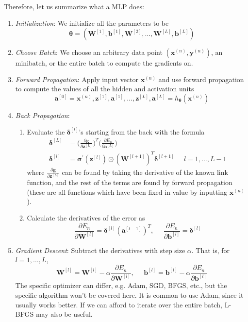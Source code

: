 \documentclass{article}
\begin{document}
    Therefore, let us summarize what a MLP does: 
    \begin{enumerate}
      \item \textit{Initialization}: We initialize all the parameters to be 
      \[\boldsymbol{\theta} = (\mathbf{W}^{[1]}, \mathbf{b}^{[1]}, \mathbf{W}^{[2]}, \ldots, \mathbf{W}^{[L]}, \mathbf{b}^{[L]})\]
      
      \item \textit{Choose Batch}: We choose an arbitrary data point $(\mathbf{x}^{(n)}, \mathbf{y}^{(n)})$, an minibatch, or the entire batch to compute the gradients on. 
      
      \item \textit{Forward Propagation}: Apply input vector $\mathbf{x}^{(n)}$ and use forward propagation to compute the values of all the hidden and activation units 
      \[\mathbf{a}^{[0]} = \mathbf{x}^{(n)}, \mathbf{z}^{[1]}, \mathbf{a}^{[1]}, \ldots, \mathbf{z}^{[L]}, \mathbf{a}^{[L]} = h_{\boldsymbol{\theta}} (\mathbf{x}^{(n)})\]
      
      \item \textit{Back Propagation}: 
      \begin{enumerate}
          \item Evaluate the $\boldsymbol{\delta}^{[l]}$'s starting from the back with the formula 
          \begin{align*}
              \boldsymbol{\delta}^{[L]} & = \bigg( \frac{\partial \mathbf{g}}{\partial \mathbf{z}^{[L]}} \bigg)^T \bigg( \frac{\partial E_n}{\partial \mathbf{a}^{[L]}} \bigg) \\
              \boldsymbol{\delta}^{[l]} & = \boldsymbol{\sigma}^\prime (\mathbf{z}^{[l]}) \odot (\mathbf{W}^{[l+1]})^T \boldsymbol{\delta}^{[l+1]} \;\;\;\;\; l = 1, \ldots, L-1
          \end{align*}
          where $\frac{\partial \mathbf{g}}{\partial \mathbf{z}^{[L]}}$ can be found by taking the derivative of the known link function, and the rest of the terms are found by forward propagation (these are all functions which have been fixed in value by inputting $\mathbf{x}^{(n)}$).  

          \item Calculate the derivatives of the error as 
          \[\frac{\partial E_n}{\partial \mathbf{W}^{[l]}} = \boldsymbol{\delta}^{[l]} (\mathbf{a}^{[l-1]})^T, \;\;\;\;\; \frac{\partial E_n}{\partial \mathbf{b}^{[l]}} = \boldsymbol{\delta}^{[l]}\]
      \end{enumerate}
      
      \item \textit{Gradient Descent}: Subtract the derivatives with step size $\alpha$. That is, for $l = 1, \ldots, L$, 
      \[\mathbf{W}^{[l]} = \mathbf{W}^{[l]} - \alpha \frac{\partial E_n}{\partial \mathbf{W}^{[l]}} , \;\;\;\;\; \mathbf{b}^{[l]} = \mathbf{b}^{[l]} - \alpha \frac{\partial E_n}{\partial \mathbf{b}^{[l]}}\]
      The specific optimizer can differ, e.g. Adam, SGD, BFGS, etc., but the specific algorithm won't be covered here. It is common to use Adam, since it usually works better. If we can afford to iterate over the entire batch, L-BFGS may also be useful. 
    \end{enumerate}
\end{document}

